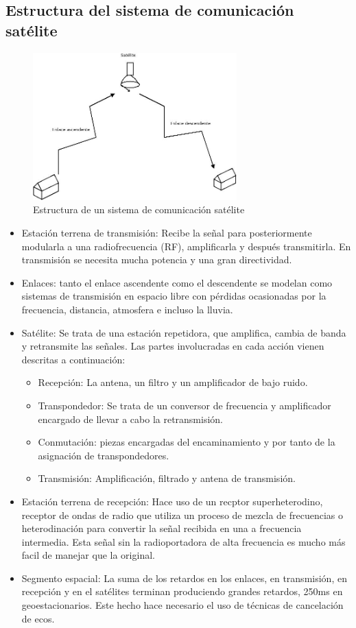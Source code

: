 	\subsection{Estructura del sistema de comunicación satélite}
	\label{sub:estructSat}
		\begin{figure}[H]
			\centering
			\includegraphics[width=0.7\textwidth]{Imagen/arquisatelite.jpg}
			\caption{Estructura de un sistema de comunicación satélite}
		\end{figure}
		\begin{itemize}
			\item Estación terrena de transmisión: Recibe la señal para posteriormente modularla a una radiofrecuencia (\acrshort{RF}), amplificarla y después transmitirla. En transmisión se necesita mucha potencia y una gran directividad.
			\item Enlaces: tanto el enlace ascendente como el descendente se modelan como sistemas de transmisión en espacio libre con pérdidas ocasionadas por la frecuencia, distancia, atmosfera e incluso la lluvia.
			\item Satélite: Se trata de una estación repetidora, que amplifica, cambia de banda y retransmite las señales. Las partes involucradas en cada acción vienen descritas a continuación:
			\begin{itemize}
				\item Recepción: La antena, un filtro y un amplificador de bajo ruido.
				\item Transpondedor: Se trata de un conversor de frecuencia y amplificador encargado de llevar a cabo la retransmisión.
				\item Conmutación: piezas encargadas del encaminamiento y por tanto de la asignación de transpondedores.
				\item Transmisión: Amplificación, filtrado y antena de transmisión.
			\end{itemize}
			\item Estación terrena de recepción: Hace uso de un recptor superheterodino, receptor de ondas de radio que utiliza un proceso de mezcla de frecuencias o heterodinación para convertir la señal recibida en una a frecuencia intermedia. Esta señal sin la radioportadora de alta frecuencia es mucho más facil de manejar que la original.
			\item Segmento espacial: La suma de los retardos en los enlaces, en transmisión, en recepción y en el satélites terminan produciendo grandes retardos, 250ms en geoestacionarios. Este hecho hace necesario el uso de técnicas de cancelación de ecos.
		\end{itemize}
